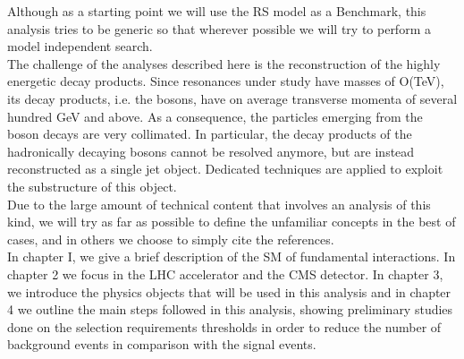 \indent
Although as a starting point we will use the RS model as a Benchmark, this analysis tries to be generic so that wherever possible we will try to perform a model independent search.\\
\indent
The challenge of the analyses described here is the reconstruction of the highly energetic decay products. Since resonances under study have masses of O(TeV), its decay products, i.e. the bosons, have on average transverse momenta of several hundred GeV and above. As a consequence, the particles emerging from the boson decays are very collimated. In particular, the decay products of the hadronically decaying bosons cannot be resolved anymore, but are
instead reconstructed as a single jet object. Dedicated techniques are applied to exploit the substructure of this object.\\
\indent 
Due to the large amount of technical content that involves an analysis of this kind, we will try as far as possible to define the unfamiliar concepts in the best of cases, and in others we choose to simply cite the references.\\
\indent
In chapter I, we give a brief description of the SM of fundamental interactions. In chapter 2 we focus in the LHC accelerator and the CMS detector. In chapter 3, we introduce the physics objects that will be used in this analysis and in
chapter 4 we outline the main steps followed in this analysis, showing preliminary studies done on the selection requirements thresholds in order to reduce the number of background events in comparison with the signal events.


